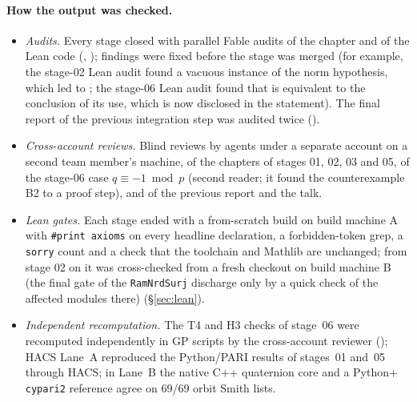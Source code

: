 \paragraph{How the output was checked.}
\begin{itemize}
\item \emph{Audits.} Every stage closed with parallel Fable audits of the chapter and of the Lean code
  (, ); findings were fixed before the stage was merged
  (for example, the stage-02 Lean audit found a vacuous instance of the norm hypothesis, which led to ;
  the stage-06 Lean audit found that  is equivalent to the conclusion of its use, which is now disclosed in
  the statement). The final report of the previous integration step was audited twice ().
\item \emph{Cross-account reviews.} Blind reviews by agents under a separate account on a second team member's machine, of the
  chapters of stages 01, 02, 03 and 05, of the stage-06 case $q\equiv-1\bmod p$ (second reader; it found the counterexample B2
  to a proof step), and of the previous report and the talk.
\item \emph{Lean gates.} Each stage ended with a from-scratch build on build machine A with \texttt{\#print axioms} on
  every headline declaration, a forbidden-token grep, a \texttt{sorry} count and a check that the toolchain and Mathlib are
  unchanged; from stage 02 on it was cross-checked from a fresh checkout on build machine B (the final gate of the
  \texttt{RamNrdSurj} discharge only by a quick check of the affected modules there) (\S\ref{sec:lean}).
\item \emph{Independent recomputation.} The T4 and H3 checks of stage~06 were recomputed independently in GP scripts by the
  cross-account reviewer (); HACS Lane~A reproduced the Python/PARI results of stages~01 and~05 through HACS;
  in Lane~B the native C++ quaternion core and a Python$+$\texttt{cypari2} reference agree on 69/69 orbit Smith lists.
\end{itemize}

